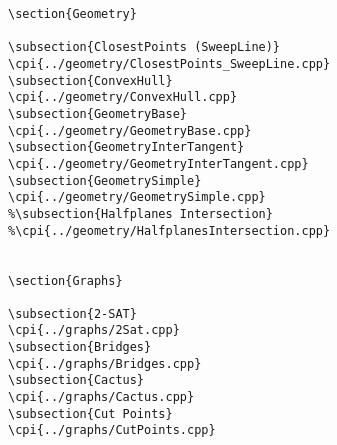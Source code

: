 {\begin{verbatim}
\section{Geometry}

\subsection{ClosestPoints (SweepLine)}
\cpi{../geometry/ClosestPoints_SweepLine.cpp}
\subsection{ConvexHull}
\cpi{../geometry/ConvexHull.cpp}
\subsection{GeometryBase}
\cpi{../geometry/GeometryBase.cpp}
\subsection{GeometryInterTangent}
\cpi{../geometry/GeometryInterTangent.cpp}
\subsection{GeometrySimple}
\cpi{../geometry/GeometrySimple.cpp}
%\subsection{Halfplanes Intersection}
%\cpi{../geometry/HalfplanesIntersection.cpp}


\section{Graphs}

\subsection{2-SAT}
\cpi{../graphs/2Sat.cpp}
\subsection{Bridges}
\cpi{../graphs/Bridges.cpp}
\subsection{Cactus}
\cpi{../graphs/Cactus.cpp}
\subsection{Cut Points}
\cpi{../graphs/CutPoints.cpp}

\end{verbatim}}
